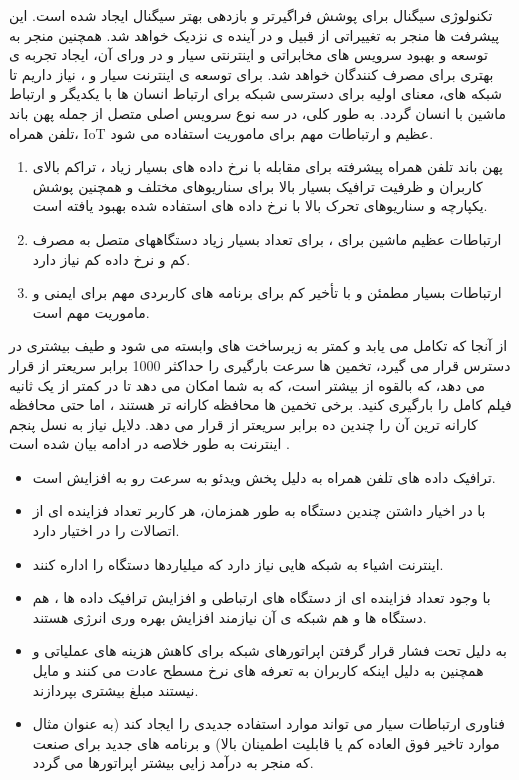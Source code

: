  
تکنولوژی سیگنال   برای پوشش فراگیرتر و بازدهی بهتر سیگنال ایجاد شده است. این پیشرفت ها منجر به تغییراتی از قبیل  و  در آینده ی نزدیک خواهد شد.
همچنین  منجر به توسعه و بهبود سرویس های مخابراتی و اینترنتی سیار و در ورای آن، ایجاد تجربه ی بهتری برای مصرف کنندگان خواهد شد.\newline
برای توسعه ی اینترنت سیار و ، نیاز داریم تا شبکه های، معنای اولیه برای دسترسی شبکه برای ارتباط انسان ها با یکدیگر و ارتباط ماشین با انسان گردد.
به طور کلی، 
 در سه نوع سرویس اصلی متصل از جمله پهن باند تلفن همراه، IoT عظیم و ارتباطات مهم برای ماموریت استفاده می شود.
\begin{enumerate}
\item 
پهن باند تلفن همراه پیشرفته 
 برای مقابله با نرخ داده های بسیار زیاد ، تراکم بالای کاربران و ظرفیت ترافیک بسیار بالا برای سناریوهای مختلف و همچنین پوشش یکپارچه و سناریوهای تحرک بالا با نرخ داده های استفاده شده بهبود یافته است.
\item
 ارتباطات  عظیم ماشین 
  برای
،
   برای تعداد بسیار زیاد دستگاههای متصل به مصرف کم و نرخ داده کم نیاز دارد.
\item 
ارتباطات بسیار مطمئن و با تأخیر کم
 برای برنامه های کاربردی مهم برای ایمنی و ماموریت
  مهم است.
\end{enumerate}
 از آنجا که
 تکامل می یابد و کمتر به زیرساخت های  وابسته می شود و طیف بیشتری در دسترس قرار می گیرد،
 تخمین ها سرعت بارگیری را حداکثر 1000 برابر سریعتر از  قرار می دهد، که بالقوه از 
بیشتر است، که به شما امکان می دهد تا در کمتر از یک ثانیه فیلم کامل
   را بارگیری کنید.
   برخی تخمین ها محافظه کارانه تر هستند ، اما حتی محافظه کارانه ترین آن را چندین ده برابر سریعتر از  قرار می دهد.
دلایل نیاز به نسل پنجم اینترنت به طور خلاصه در ادامه بیان شده است \citep{etsi}.
\begin{itemize}
\item ترافیک داده های تلفن همراه به دلیل پخش ویدئو به سرعت رو به افزایش است.
\item با در اخیار داشتن چندین دستگاه به طور همزمان، هر کاربر تعداد فزاینده ای از اتصالات را در اختیار دارد.
\item اینترنت اشیاء به شبکه هایی نیاز دارد که میلیاردها دستگاه را اداره کنند.
\item با وجود تعداد فزاینده ای از دستگاه های ارتباطی و افزایش ترافیک داده ها ، هم دستگاه ها و هم شبکه ی  
آن
نیازمند افزایش بهره وری انرژی هستند.
\item 
 به دلیل تحت فشار قرار گرفتن اپراتورهای شبکه برای کاهش هزینه های عملیاتی و همچنین به دلیل اینکه کاربران به تعرفه های نرخ مسطح عادت می کنند و مایل نیستند مبلغ بیشتری بپردازند.
\item فناوری ارتباطات سیار می تواند موارد استفاده جدیدی را ایجاد کند (به عنوان مثال موارد تاخیر فوق العاده کم یا قابلیت اطمینان بالا) و برنامه های جدید برای صنعت که منجر به درآمد زایی بیشتر اپراتورها می گردد.
\end{itemize}
